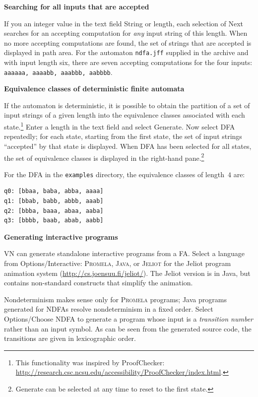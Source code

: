 \documentclass[11pt]{article}
\newcommand{\prm}{\textsc{Promela}}
\newcommand{\p}[1]{\texttt{#1}}
\newcommand{\bu}[1]{\textsf{#1}}
\begin{document}
\newpage 

\noindent\textbf{Searching for all inputs that are accepted}

If you an integer value in the text field \bu{String or length},
each selection of \bu{Next}
searches for an accepting computation for \emph{any} input string of
this length. When no more accepting computations are found,
the set of strings that are accepted is displayed in path area.
For the automaton \p{ndfa.jff} supplied in the archive and with input length six, 
there are seven accepting computations for the four inputs:
\p{aaaaaa, aaaabb, aaabbb, aabbbb}.

\bigskip
\bigskip

\noindent\textbf{Equivalence classes of deterministic finite automata}

If the automaton is  deterministic, it is possible to obtain
the partition of a set of input strings of a given length
into the equivalence classes 
associated with each state.\footnote{This functionality was inspired by \bu{ProofChecker}:\\ \hspace*{2cm}\url{http://research.csc.ncsu.edu/accessibility/ProofChecker/index.html}.}
Enter a length in the text field and select \bu{Generate}.
Now select \bu{DFA} repeatedly;
for each state, starting from the first state, the set of input strings ``accepted'' by that
state is displayed. When \bu{DFA} has been selected for all states,
the set of equivalence classes is displayed in the right-hand pane.\footnote{\bu{Generate} 
can be selected at any time to reset to the first state.}

For the DFA in the \p{examples} directory, the equivalence classes
of length~$4$ are:
\begin{verbatim}
q0: [bbaa, baba, abba, aaaa]
q1: [bbab, babb, abbb, aaab]
q2: [bbba, baaa, abaa, aaba]
q3: [bbbb, baab, abab, aabb]
\end{verbatim}

\bigskip
\bigskip

\noindent\textbf{Generating interactive programs}

VN can generate standalone interactive programs from a FA.
Select a language from \bu{Options/Interactive}: \prm{}, \textsc{Java},
or \textsc{Jeliot} for the Jeliot program animation system 
(\url{http://cs.joensuu.fi/jeliot/}). The Jeliot version is in Java,
but contains non-standard constructs that simplify the animation.

Nondeterminism makes sense only for \prm{} programs;
Java programs generated for NDFAs resolve nondeterminism in a fixed order.
Select \bu{Options/Choose NDFA} to generate a program whose input is
a \emph{transition number} rather than an input symbol.
As can be seen from the generated source code, 
the transitions are given in lexicographic order.
\end{document}

